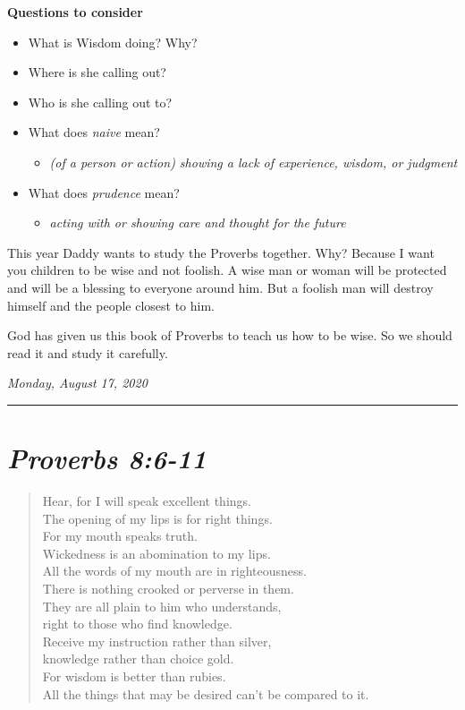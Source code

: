 \documentclass[
]{book}
\providecommand{\tightlist}{%
  \setlength{\itemsep}{0pt}\setlength{\parskip}{0pt}}
\begin{document}
\textbf{Questions to consider}

\begin{itemize}
\tightlist
\item
  What is Wisdom doing? Why?
\item
  Where is she calling out?
\item
  Who is she calling out to?
\item
  What does \emph{naive} mean?

  \begin{itemize}
  \tightlist
  \item
    \emph{(of a person or action) showing a lack of experience, wisdom, or judgment}
  \end{itemize}
\item
  What does \emph{prudence} mean?

  \begin{itemize}
  \tightlist
  \item
    \emph{acting with or showing care and thought for the future}
  \end{itemize}
\end{itemize}

This year Daddy wants to study the Proverbs together. Why? Because I want you children to be wise and not foolish. A wise man or woman will be protected and will be a blessing to everyone around him. But a foolish man will destroy himself and the people closest to him.

God has given us this book of Proverbs to teach us how to be wise. So we should read it and study it carefully.

\emph{Monday, August 17, 2020}

\begin{center}\rule{0.5\linewidth}{0.5pt}\end{center}

\hypertarget{proverbs-86-11}{%
\section{\texorpdfstring{\emph{Proverbs 8:6-11}}{Proverbs 8:6-11}}\label{proverbs-86-11}}

\begin{quote}
Hear, for I will speak excellent things.\\
The opening of my lips is for right things.\\
For my mouth speaks truth.\\
Wickedness is an abomination to my lips.\\
All the words of my mouth are in righteousness.\\
There is nothing crooked or perverse in them.\\
They are all plain to him who understands,\\
right to those who find knowledge.\\
Receive my instruction rather than silver,\\
knowledge rather than choice gold.\\
For wisdom is better than rubies.\\
All the things that may be desired can't be compared to it.
\end{quote}
\end{document}
